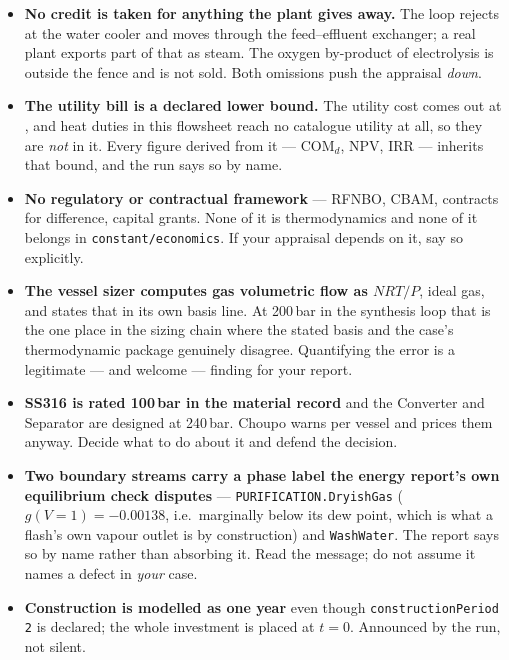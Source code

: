\documentclass[11pt,a4paper]{article}
\begin{document}
\begin{itemize}[leftmargin=*]
\item \textbf{No credit is taken for anything the plant gives away.} The loop
      rejects  at the water cooler and moves
       through the feed--effluent exchanger; a real plant
      exports part of that as steam. The oxygen by-product of electrolysis is
      outside the fence and is not sold. Both omissions push the appraisal
      \emph{down}.
\item \textbf{The utility bill is a declared lower bound.} The utility cost
      comes out at , and 
      heat duties in this flowsheet reach no catalogue utility at all, so they
      are \emph{not} in it. Every figure derived from it --- COM$_d$, NPV,
      IRR --- inherits that bound, and the run says so by name.
\item \textbf{No regulatory or contractual framework} --- RFNBO, CBAM,
      contracts for difference, capital grants. None of it is thermodynamics
      and none of it belongs in \texttt{constant/economics}. If your appraisal
      depends on it, say so explicitly.
\item \textbf{The vessel sizer computes gas volumetric flow as $NRT/P$}, ideal
      gas, and states that in its own basis line. At 200\,bar in the synthesis
      loop that is the one place in the sizing chain where the stated basis and
      the case's thermodynamic package genuinely disagree. Quantifying the
      error is a legitimate --- and welcome --- finding for your report.
\item \textbf{SS316 is rated 100\,bar in the material record} and the Converter
      and Separator are designed at 240\,bar. Choupo warns per vessel and
      prices them anyway. Decide what to do about it and defend the decision.
\item \textbf{Two boundary streams carry a phase label the energy report's own
      equilibrium check disputes} --- \texttt{PURIFICATION.DryishGas}
      ($g(V{=}1) = -0.00138$, i.e.\ marginally below its dew point, which is
      what a flash's own vapour outlet is by construction) and
      \texttt{WashWater}. The report says so by name rather than absorbing it.
      Read the message; do not assume it names a defect in \emph{your} case.
\item \textbf{Construction is modelled as one year} even though
      \texttt{constructionPeriod 2} is declared; the whole investment is placed
      at $t=0$. Announced by the run, not silent.
\end{itemize}
\end{document}
